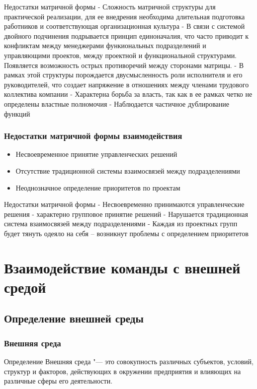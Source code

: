 \documentclass{../industrial-development}
\begin{document}
\lecturenotes
Недостатки матричной формы
- Сложность матричной структуры для практической реализации, для ее внедрения необходима длительная подготовка работников и соответствующая организационная культура
- В связи с системой двойного подчинения подрывается принцип единоначалия, что часто приводит к конфликтам между менеджерами функиональных подразделений и управляющими проектов, между проектной и функциональной структурами. Появляется возможность острых противоречий между сторонами матрицы.
- В рамках этой структуры порождается двусмысленность роли исполнителя и его руководителей, что создает напряжение в отношениях между членами трудового коллектива компании
- Характерна борьба за власть, так как в ее рамках четко не определены властные полномочия
- Наблюдается частичное дублирование функций

\begin{frame} \frametitle{Недостатки матричной формы взаимодействия}
\begin{itemize}
  \item Несвоевременное принятие управленческих решений
  \item Отсутствие традиционной системы взаимосвязей между подразделениями
  \item Неоднозначное определение приоритетов по проектам
  \end{itemize}
\end{frame}

\lecturenotes
Недостатки матричной формы
- Несвоевременно принимаются управленческие решения - характерно групповое принятие решений
- Нарушается традиционная система взаимосвязей между подразделениями
- Каждая из проектных групп будет тянуть одеяло на себя – возникнут проблемы  с определением приоритетов

\section{Взаимодействие команды с внешней средой}

\subsection{Определение внешней среды}
\begin{frame} \frametitle{Внешняя среда}
	\begin{block}{Определение}
		\alert{Внешняя среда} "--- это совокупность различных субъектов, условий, структур и факторов, действующих в окружении предприятия и влияющих на различные сферы его деятельности.
	\end{block}
\end{frame}
\end{document}
